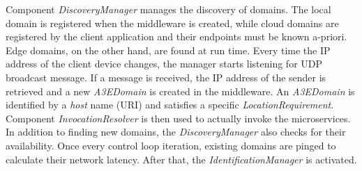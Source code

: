 Component \textit{DiscoveryManager} manages the discovery of domains. The local domain is registered when the middleware is created, while cloud domains are registered by the client application and their endpoints must be known a-priori. Edge domains, on the other hand, are found at run time. Every time the IP address of the client device changes, the manager starts listening for UDP broadcast message. If a message is received, the IP address of the sender is retrieved and a new \textit{A3EDomain} is created in the middleware. An \textit{A3EDomain} is identified by a \textit{host} name (URI) and satisfies a specific \textit{LocationRequirement}. Component \textit{InvocationResolver} is then used to actually invoke the microservices. 
In addition to finding new domains, the \textit{DiscoveryManager} also checks for their availability. Once every control loop iteration, existing domains are pinged to calculate their network latency. After that, the \textit{IdentificationManager} is activated.



